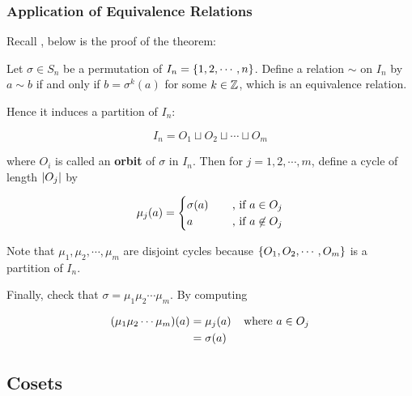 \documentclass[a4paper,12pt]{article}
\begin{document}
\subsubsection{Application of Equivalence Relations}
Recall \rthm[\sctd{20}], below is the proof of the theorem:\n

\begin{prv}
  Let $\sigma\in S_{n}$ be a permutation of $I_{n}=\left\{ 1,2,\cdots,n\right\}$. Define a relation $\sim$ on $I_{n}$ by $a\sim b$ if and only if $b=\sigma^{k}(a)$ for some $k\in\mathbb{Z}$, which is an equivalence relation.\n

  Hence it induces a partition of $I_{n}$:

  $$I_{n}=O_{1}\sqcup O_{2}\sqcup\cdots\sqcup O_{m}$$\s

  where $O_{i}$ is called an \textbf{orbit} of $\sigma$ in $I_{n}$. Then for $j=1,2,\cdots,m$, define a cycle of length $\left| O_{j}\right|$ by

  $$\mu_{j}(a)=\begin{cases}
    \sigma(a)&\;\;\;\;\text{, if }a\in O_{j}\\
    a&\;\;\;\;\text{, if }a\not\in O_{j}
  \end{cases}$$\s

  Note that $\mu_{1},\mu_{2},\cdots,\mu_{m}$ are disjoint cycles because $\left\{ O_{1},O_{2},\cdots,O_{m}\right\}$ is a partition of $I_{n}$.\n

  Finally, check that $\sigma=\mu_{1}\mu_{2}\cdots\mu_{m}$. By computing

  $$\begin{aligned}[t]
    (\mu_{1}\mu_{2}\cdots\mu_{m})(a)&=\mu_{j}(a)\;\;\;\;\text{where }a\in O_{j}\\
    &=\sigma(a)
  \end{aligned}$$
\end{prv}

\subsection{Cosets}
\end{document}

